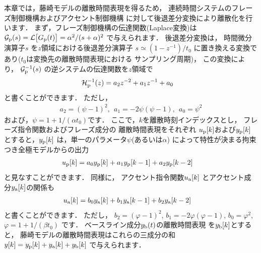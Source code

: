 



本章では，藤崎モデルの離散時間表現を得るため，
連続時間システムのフレーズ制御機構およびアクセント制御機構
に対して後退差分変換により離散化を行います．
まず，フレーズ制御機構の伝達関数(Laplace変換)は
$%
\mathcal{G}_{\rm p}(s)= 
\mathcal{L}\big[G_{\rm p}(t)\big]=
{\alpha^2}/{(s+\alpha)^2}
$%
で与えられます．
後退差分変換は，
時間微分演算子$s$
を$z$領域における後退差分演算子
$
s\simeq
{(1-z^{-1})}/{t_{0}}
$
に置き換える変換であり($t_0$は変換先の離散時間表現における
サンプリング周期)，
この変換により，
$\mathcal{G}^{-1}_{\rm p}(s)$
の逆システムの伝達関数を$z$領域で
\begin{align}
\mathcal{H}_{\rm p}^{-1}(z)&= 
a_2
z^{-2}
+a_1
z^{-1}
+a_0
\end{align}
と書くことができます．
ただし，
\begin{align}
a_2 = (\psi-1)^2,~~
a_1 = -2\psi(\psi-1),~~
a_0 = \psi^2
\label{eq:a_psi}
\end{align}
および，$\psi = 1+1/(\alpha t_0)$です．
ここで，$k$を離散時刻インデックスとし，
フレーズ指令関数およびフレーズ成分の
離散時間表現をそれぞれ
$u_{\rm p}[k]$および$y_{\rm p}[k]$
とすると，$y_{\rm p}[k]$
は，単一のパラメータ$\psi$(あるいは$\alpha$)
によって特性が決まる拘束つき全極モデルからの出力
\begin{align}
&u_{\rm p}[k] = a_0 y_{\rm p}[k]+a_1y_{\rm p}[k-1]+a_2y_{\rm p}[k-2]
\end{align}
と見なすことができます．
同様に，
アクセント指令関数$u_{\rm a}[k]$
とアクセント成分$y_{\rm a}[k]$の関係も
\begin{align}
u_{\rm a}[k] &= b_0 y_{\rm a}[k]+b_1y_{\rm a}[k-1]+b_2y_{\rm a}[k-2]
\end{align}
と書くことができます．
ただし，
$b_2 = (\varphi-1)^2$, $b_1 = -2\varphi(\varphi-1)$,
$b_0 = \varphi^2$, 
$\varphi = 1+1/(\beta t_0)$
です．
ベースライン成分$y_{\rm b}(t)$の離散時間表現
を$y_{\rm b}[k]$とすると，
藤崎モデルの離散時間表現はこれらの三成分の和
$y[k]=y_{\rm p}[k]+y_{\rm a}[k]+y_{\rm b}[k]$
で与えられます．


